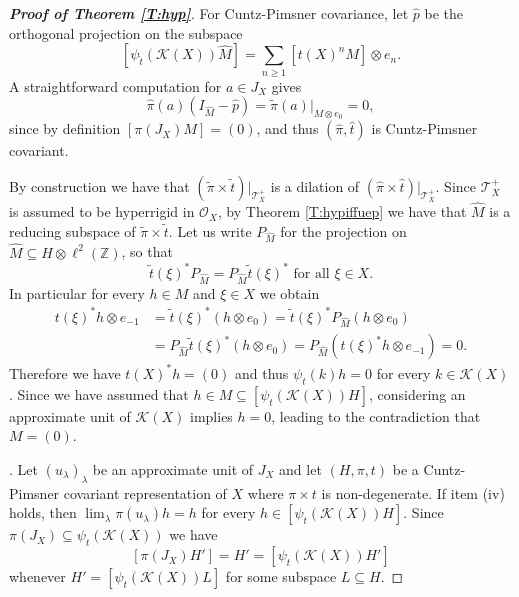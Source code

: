 \documentclass[11pt, draft]{amsart}
\numberwithin{equation}{section}
\theoremstyle{plain}
\theoremstyle{definition}
\theoremstyle{remark}
\newcommand{\K}{{\mathcal{K}}}
\renewcommand{\O}{{\mathcal{O}}}
\newcommand{\T}{{\mathcal{T}}}
\def\la{\lambda}
\newcommand{\bZ}{\mathbb{Z}}
\newcommand{\foral}{\text{ for all }}
\newcommand{\wt}{\widetilde}
\newcommand{\wh}{\widehat}
\begin{document}
\begin{proof}[{\bf Proof of Theorem \ref{T:hyp}}]
For Cuntz-Pimsner covariance, let $\wh{p}$ be the orthogonal projection on the subspace
\[
[\psi_{\wh{t}}(\K(X)) \wh{M}] = \sum_{n \geq 1} [t(X)^n M] \otimes e_n.
\]
A straightforward computation for $a \in J_X$ gives
\[
\wh{\pi}(a)(I_{\wh{M}} - \wh{p}) = \wt{\pi}(a)|_{M\otimes e_0} = 0,
\]
since by definition $[\pi(J_X) M] = (0)$, and thus $(\wh{\pi},\wh{t})$ is Cuntz-Pimsner covariant.

By construction we have that $(\wt{\pi} \times \wt{t})|_{\T_X^+}$ is a dilation of $(\wh{\pi} \times \wh{t})|_{\T_X^+}$.
Since $\T_X^+$ is assumed to be hyperrigid in $\O_X$, by Theorem \ref{T:hypiffuep} we have that $\wh{M}$ is a reducing subspace of $\wt{\pi} \times \wt{t}$.
Let us write $P_{\wh{M}}$ for the projection on $\wh{M} \subseteq H \otimes \ell^2(\bZ)$, so that
\[
\wt{t}(\xi)^* P_{\wh{M}} = P_{\wh{M}} \wt{t}(\xi)^* \foral \xi \in X.
\]
In particular for every $h \in M$ and $\xi \in X$ we obtain
\begin{align*}
t(\xi)^* h \otimes e_{-1}
& =
\wt{t}(\xi)^* (h \otimes e_{0})
=
\wt{t}(\xi)^* P_{\wh{M}} (h \otimes e_{0}) \\
& = 
P_{\wh{M}} \wt{t}(\xi)^* (h \otimes e_0)
=
P_{\wh{M}} (t(\xi)^*h \otimes e_{-1})
=
0.
\end{align*}
Therefore we have $t(X)^* h = (0)$ and thus $\psi_t(k) h = 0$ for every $k \in \K(X)$.
Since we have assumed that $h \in M \subseteq [\psi_t(\K(X))H]$, considering an approximate unit of $\K(X)$ implies $h =0$, leading to the contradiction that $M = (0)$.

\medskip

\noindent
[(iv) $\Rightarrow$ (v)]. 
Let $(u_\la)_\la$ be an approximate unit of $J_X$ and let $(H,\pi,t)$ be a Cuntz-Pimsner covariant representation of $X$ where $\pi\times t$ is non-degenerate.
If item (iv) holds, then $\lim_\la \pi(u_\la) h = h$ for every $h \in [\psi_t(\K(X))H]$.
Since $\pi(J_X) \subseteq \psi_t(\K(X))$ we have
\[
[\pi(J_X) H'] = H'= [\psi_t(\K(X)) H']
\]
whenever $H'= [\psi_t(\K(X))L]$ for some subspace $L\subseteq H$.


\end{proof}
\end{document}
